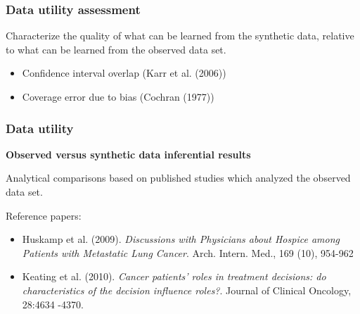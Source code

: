 \documentclass[11pt,handout]{beamer}
\begin{document}
\begin{frame}
\frametitle{Data utility assessment}
Characterize the quality of what can be learned from the synthetic data, relative to what can be learned from the observed data set.

\begin{itemize}
\item Confidence interval overlap (Karr et al.  (2006))
\item Coverage error due to bias  (Cochran (1977))
\end{itemize}
\end{frame}



\begin{frame}
\frametitle{Data utility}

\textbf{Observed versus synthetic data inferential results}

\vspace{0.1in}

Analytical comparisons based on published studies which analyzed the observed data set.

\vspace{0.1in}

Reference papers: 
\begin{itemize}
\item Huskamp et al. (2009).  \emph{Discussions with Physicians about Hospice among Patients with Metastatic Lung Cancer}.  Arch. Intern. Med.,  169 (10),  954-962
\item Keating et al. (2010). \emph{Cancer patients' roles in treatment decisions: do characteristics
of the decision influence roles?}.   Journal of Clinical Oncology, 28:4634 -4370.
\end{itemize}

\end{frame}
\end{document}
